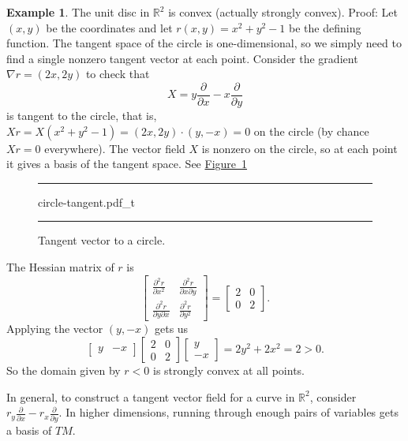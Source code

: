 \documentclass[12pt,openany]{book}
\newcommand{\R}{{\mathbb{R}}}
\theoremstyle{plain}
\theoremstyle{remark}
\theoremstyle{definition}
\newenvironment{myfig}{%
\begin{figure}[h!t]
\noindent\rule{\textwidth}{0.5pt}\vspace{12pt}\par\centering}%
{\par\noindent\rule{\textwidth}{0.5pt}
\end{figure}}
\theoremstyle{exercise}
\theoremstyle{example}
\newtheorem{example}[thm]{Example}
\newcommand{\figureref}[1]{\hyperref[#1]{Figure~\ref*{#1}}}
\begin{document}
\begin{example}
The unit disc in $\R^2$ is
convex (actually strongly convex).
Proof:
Let $(x,y)$ be the coordinates and
let $r(x,y) = x^2+y^2-1$ be the 
defining function.
The tangent space of the circle is one-dimensional, so we simply need to
find a single nonzero tangent vector at each point.
Consider the gradient
%
$\nabla r = (2x,2y)$ to check that
\begin{equation*}
X = y \frac{\partial}{\partial x} - x \frac{\partial}{\partial y}
\end{equation*}
is tangent to the circle, that is,
$Xr = X(x^2+y^2-1) = (2x,2y) \cdot (y,-x) = 0$ on the circle
(by chance $Xr=0$ everywhere).
The vector field $X$ is nonzero on the circle, so at each point it gives a
basis of the tangent space.  See \figureref{fig:circle-tangent}
\begin{myfig}
{circle-tangent.pdf_t}
\caption{Tangent vector to a circle.\label{fig:circle-tangent}}
\end{myfig}

The Hessian matrix of $r$ is
\begin{equation*}
\begin{bmatrix}
\frac{\partial^2 r}{\partial x^2} &
\frac{\partial^2 r}{\partial x \partial y} \\
\frac{\partial^2 r}{\partial y \partial x} &
\frac{\partial^2 r}{\partial y^2}
\end{bmatrix}
=
\begin{bmatrix}
2 & 0 \\
0 & 2
\end{bmatrix} .
\end{equation*}
Applying the vector $(y,-x)$ gets us
\begin{equation*}
\begin{bmatrix}
y & -x
\end{bmatrix}
\begin{bmatrix}
2 & 0 \\
0 & 2
\end{bmatrix}
\begin{bmatrix}
y \\ -x
\end{bmatrix}
=
2y^2+2x^2 = 2 > 0 .
\end{equation*}
So the domain given by $r < 0$ is strongly convex at all points.
\end{example}

In general, to construct a tangent vector field for
a curve in $\R^2$,
consider
$r_y \frac{\partial}{\partial x} - r_x \frac{\partial}{\partial y}$.  In
higher dimensions, running through enough pairs of variables gets
a basis of $TM$.
\end{document}
